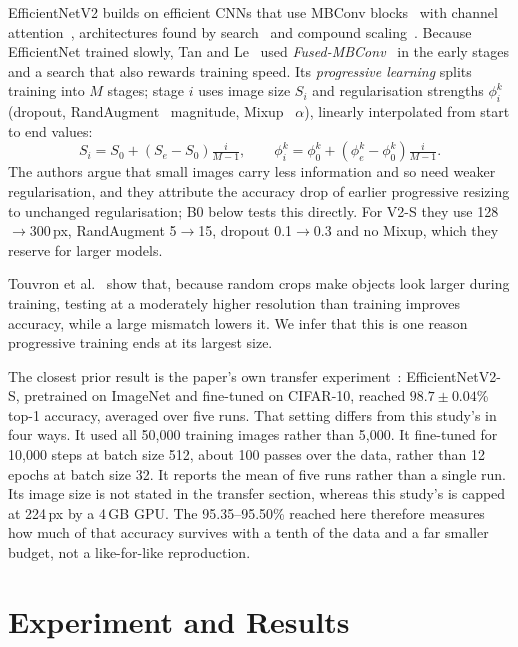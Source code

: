 \documentclass{COMPXXXX}
\begin{document}
EfficientNetV2 builds on efficient CNNs that use MBConv blocks~\cite{sandler2018mobilenetv2} with
channel attention~\cite{hu2018squeeze}, architectures found by search~\cite{tan2019mnasnet,howard2019searching}
and compound scaling~\cite{tan2019efficientnet}. Because EfficientNet trained slowly, Tan and
Le~\cite{tan2021efficientnetv2} used \emph{Fused-MBConv}~\cite{gupta2020accelerator} in the early stages
and a search that also rewards training speed. Its \emph{progressive learning} splits training into $M$ stages; stage
$i$ uses image size $S_i$ and regularisation strengths $\phi_i^{k}$ (dropout,
RandAugment~\cite{cubuk2020randaugment} magnitude, Mixup~\cite{zhang2018mixup} $\alpha$), linearly
interpolated from start to end values:
\begin{equation}
S_i = S_0 + (S_e - S_0)\tfrac{i}{M-1},\qquad
\phi_i^{k} = \phi_0^{k} + (\phi_e^{k}-\phi_0^{k})\tfrac{i}{M-1}.
\label{eq:prog}
\end{equation}
The authors argue that small images carry less information and so need weaker regularisation, and
they attribute the accuracy drop of earlier progressive resizing to unchanged regularisation; B0
below tests this directly. For V2-S they use 128$\to$300\,px, RandAugment
5$\to$15, dropout 0.1$\to$0.3 and no Mixup, which they reserve for larger models.

Touvron et al.~\cite{touvron2019fixing} show that, because random crops make objects look larger
during training, testing at a moderately higher resolution than training improves accuracy, while a
large mismatch lowers it. We infer that this is one reason progressive training ends at its largest
size.

The closest prior result is the paper's own transfer experiment~\cite[Table~8]{tan2021efficientnetv2}:
EfficientNetV2-S, pretrained on ImageNet and fine-tuned on CIFAR-10, reached
$98.7\pm0.04$\% top-1 accuracy, averaged over five runs. That setting differs from this study's in four ways.
It used all 50{,}000 training images rather than 5{,}000. It fine-tuned for 10{,}000 steps at batch
size 512, about 100 passes over the data, rather than 12 epochs at batch size 32. It reports the mean
of five runs rather than a single run. Its image size is not stated in the transfer section, whereas
this study's is capped at 224\,px by a 4\,GB GPU. The 95.35--95.50\% reached here therefore measures how much of that
accuracy survives with a tenth of the data and a far smaller budget, not a like-for-like
reproduction.

\section{Experiment and Results}
\end{document}
